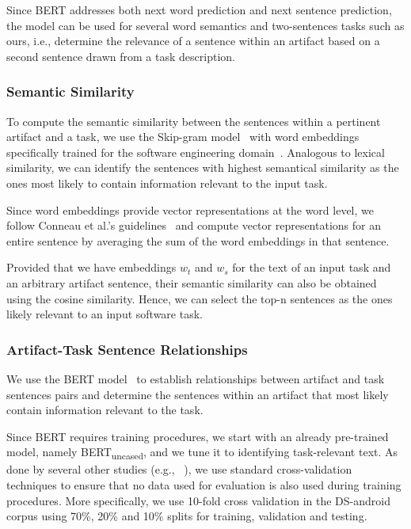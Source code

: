 Since BERT addresses both next word prediction and next sentence prediction, the model can be used for several
word semantics and two-sentences tasks such as  ours, i.e., determine the relevance of a sentence within an artifact based on a second sentence drawn from a task description.





\subsubsection{Semantic Similarity}
\label{cp5:skip-gram}





To compute the semantic similarity between the sentences within a pertinent artifact and a task,
we use the Skip-gram model~\cite{Mikolov2013} with word embeddings specifically trained for the software engineering domain~\cite{Efstathiou2018}.
Analogous to lexical similarity,  we can identify the sentences with highest semantical similarity 
as the ones most likely to contain information relevant to the input task.



Since word embeddings provide vector representations at the word level, we follow Conneau et al.'s guidelines~\cite{conneau2018} 
and compute vector representations for an entire sentence by averaging the sum of the word embeddings in that sentence.


Provided that we have embeddings $w_t$ and $w_s$ for the text 
of an input task and an arbitrary artifact sentence, 
their semantic similarity can also be obtained 
using the cosine similarity. Hence, we can select the top-n sentences as the ones likely relevant to an input software task.





\subsubsection{Artifact-Task Sentence Relationships}
\label{cp5:bert}


We use the BERT model~\cite{Devlin2018Bert} to establish relationships between artifact and task sentences pairs and determine 
the sentences within an artifact that most likely contain information relevant to the task.


Since BERT requires training procedures, we start with an already pre-trained model, namely BERT\textsubscript{uncased}, and we tune it to  identifying task-relevant text.
As done by several other studies (e.g., ~\cite{Chaparro2017, fucci2019, Petrosyan2015}), we use standard cross-validation techniques to ensure  that no data used for evaluation is also used
during training procedures. More specifically, we use 10-fold cross validation in the \acs{DS-android} corpus 
using 70\%, 20\% and 10\% splits for training, validation and testing. 


